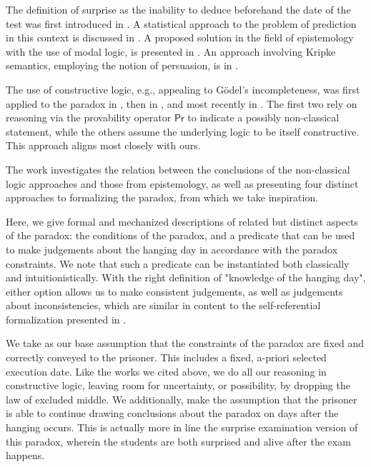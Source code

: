\documentclass[runningheads]{llncs}
\begin{document}
The definition of surprise as the inability to deduce beforehand the date of the test
was first introduced in \cite{prediction}. A statistical approach to the problem
of prediction in this context is discussed in \cite{statistical}.
A proposed solution in the field of epistemology with the use of modal
logic, is presented in \cite{modalepistemic}. An approach involving
Kripke semantics, employing the notion of persuasion, is in \cite{kripkemodal}.

The use of constructive logic,
e.g., appealing to G\"{o}del's incompleteness, was first applied to the
paradox in \cite{goedelized}, then in \cite{godelinconsistent}, and most recently
in \cite{constructive} \cite{nonpredet}. The first two rely on reasoning via the provability operator $\mathsf{Pr}$ to indicate
a possibly non-classical statement, while the others assume the underlying logic to be itself
constructive. This approach aligns most closely with ours.

The work \cite{fourpossible} investigates the relation between the conclusions
of the non-classical logic approaches and those from epistemology, as well
as presenting four distinct approaches to formalizing the paradox, from which
we take inspiration.

Here, we give formal and mechanized descriptions of related but distinct aspects of the
paradox: the conditions of the
paradox, and a predicate that can be used to make judgements about the hanging day
in accordance with the paradox constraints. We note that such a predicate
can be instantiated both classically and intuitionistically. With the
right definition of "knowledge of the hanging day", either option allows us
to make consistent judgements, as well as judgements about inconsistencies,
which are similar in content to the self-referential formalization presented
in \cite{godelinconsistent}.

We take as our base assumption that the constraints of the paradox are
fixed and correctly conveyed to the prisoner. This includes a fixed, a-priori selected execution date.
Like the works we cited above, we do all our reasoning in constructive logic,
leaving room for uncertainty, or possibility, by
dropping the law of excluded middle. We additionally, make the assumption that
the prisoner is able to continue drawing conclusions about the paradox on days
after the hanging occurs. This is actually more in line the surprise examination version of this paradox,
wherein the students are both surprised and alive after the exam happens.
\end{document}
